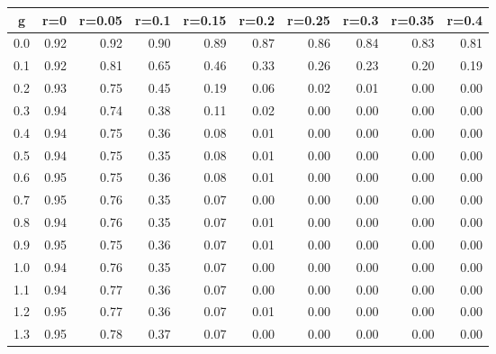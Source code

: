 %
\begin{table}[!tbp]
 \begin{center}
 \begin{tabular}{rrrrrrrrrr}\hline\hline
\multicolumn{1}{c}{g}&\multicolumn{1}{c}{r=0}&\multicolumn{1}{c}{r=0.05}&\multicolumn{1}{c}{r=0.1}&\multicolumn{1}{c}{r=0.15}&\multicolumn{1}{c}{r=0.2}&\multicolumn{1}{c}{r=0.25}&\multicolumn{1}{c}{r=0.3}&\multicolumn{1}{c}{r=0.35}&\multicolumn{1}{c}{r=0.4}\tabularnewline
\hline
0.0&0.92&0.92&0.90&0.89&0.87&0.86&0.84&0.83&0.81\tabularnewline
0.1&0.92&0.81&0.65&0.46&0.33&0.26&0.23&0.20&0.19\tabularnewline
0.2&0.93&0.75&0.45&0.19&0.06&0.02&0.01&0.00&0.00\tabularnewline
0.3&0.94&0.74&0.38&0.11&0.02&0.00&0.00&0.00&0.00\tabularnewline
0.4&0.94&0.75&0.36&0.08&0.01&0.00&0.00&0.00&0.00\tabularnewline
0.5&0.94&0.75&0.35&0.08&0.01&0.00&0.00&0.00&0.00\tabularnewline
0.6&0.95&0.75&0.36&0.08&0.01&0.00&0.00&0.00&0.00\tabularnewline
0.7&0.95&0.76&0.35&0.07&0.00&0.00&0.00&0.00&0.00\tabularnewline
0.8&0.94&0.76&0.35&0.07&0.01&0.00&0.00&0.00&0.00\tabularnewline
0.9&0.95&0.75&0.36&0.07&0.01&0.00&0.00&0.00&0.00\tabularnewline
1.0&0.94&0.76&0.35&0.07&0.00&0.00&0.00&0.00&0.00\tabularnewline
1.1&0.94&0.77&0.36&0.07&0.00&0.00&0.00&0.00&0.00\tabularnewline
1.2&0.95&0.77&0.36&0.07&0.01&0.00&0.00&0.00&0.00\tabularnewline
1.3&0.95&0.78&0.37&0.07&0.00&0.00&0.00&0.00&0.00\tabularnewline
\hline
\end{tabular}

\end{center}

\end{table}

